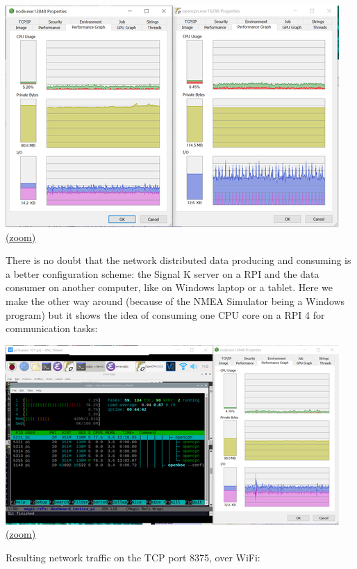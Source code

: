 \documentclass[11pt]{article}
\begin{document}
    \includegraphics{2020-02-09_dgb_procexp_01_instrucjs_clients_alpha_02_sk1-21-0_max_nof_NMEA-2000_msgs.png}
\href{img/2020-02-09_dgb_procexp_01_instrucjs_clients_alpha_02_sk1-21-0_max_nof_NMEA-2000_msgs.png}{(zoom)}

    There is no doubt that the network distributed data producing and
consuming is a better configuration scheme: the Signal K server on a RPI
and the data consumer on another computer, like on Windows laptop or a
tablet. Here we make the other way around (because of the NMEA Simulator
being a Windows program) but it shows the idea of consuming one CPU core
on a RPI 4 for communication tasks:

    \includegraphics{2020-02-09_dgb_htop_procexp_01_instrujs_clients_alpha_02_sk1-21-0_RPIclient_WinSKsrv.png}
\href{img/2020-02-09_dgb_htop_procexp_01_instrujs_clients_alpha_02_sk1-21-0_RPIclient_WinSKsrv.png}{(zoom)}

    Resulting network traffic on the TCP port 8375, over WiFi:
\end{document}
